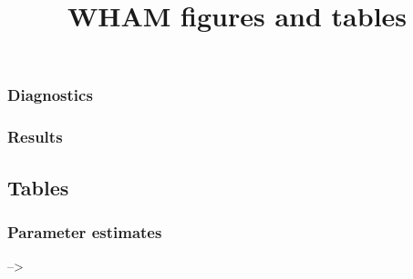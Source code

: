 \documentclass[
]{article}
\title{WHAM figures and tables}
\author{}
\date{\vspace{-2.5em}}
\begin{document}
\maketitle

\hypertarget{diagnostics}{%
\subsubsection{Diagnostics}\label{diagnostics}}

\hypertarget{results}{%
\subsubsection{Results}\label{results}}

\hypertarget{tables}{%
\subsection{Tables}\label{tables}}

\hypertarget{parameter-estimates}{%
\subsubsection{Parameter estimates}\label{parameter-estimates}}

--\textgreater{}
\end{document}
